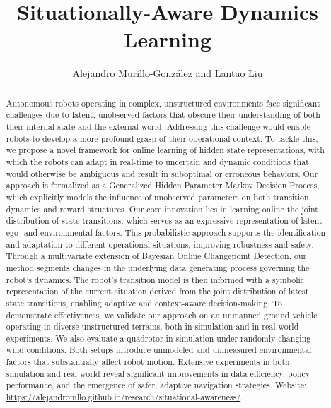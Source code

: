 \documentclass[Afour,sageh,times]{sagej}
\theoremstyle{lemma}
\begin{document}


\title{Situationally-Aware Dynamics Learning}

\author{}
\author{Alejandro Murillo-González {\normalsize and}
    Lantao Liu%
}%
%

\begin{abstract}
Autonomous robots operating in complex, unstructured environments face significant challenges due to latent, unobserved factors that obscure their understanding of both their internal state and the external world. Addressing this challenge would enable robots to develop a more profound grasp of their operational context. To tackle this, we propose a novel framework for online learning of hidden state representations, with which the robots can adapt in real-time to uncertain and dynamic conditions that would otherwise be ambiguous and result in suboptimal or erroneous behaviors. Our approach is formalized as a Generalized Hidden Parameter Markov Decision Process, which explicitly models the influence of unobserved parameters on both transition dynamics and reward structures. Our core innovation lies in learning online the joint distribution of state transitions, which serves as an expressive representation of latent ego- and environmental-factors.  This probabilistic approach supports the identification and adaptation to different operational situations, improving robustness and safety.  Through a multivariate extension of Bayesian Online Changepoint Detection, our method segments changes in the underlying data generating process governing the robot's dynamics. The robot's transition model is then informed with a symbolic representation of the current situation derived from the joint distribution of latest state transitions, enabling adaptive and context-aware decision-making. 
To demonstrate effectiveness, we validate our approach on an unmanned ground vehicle operating in diverse unstructured terrains, both in simulation and in real-world experiments. We also evaluate a quadrotor in simulation under randomly changing wind conditions. Both setups introduce unmodeled and unmeasured environmental factors that substantially affect robot motion.
Extensive experiments in both simulation and real world reveal significant improvements in data efficiency, policy performance, and the emergence of safer, adaptive navigation strategies. 
Website: \url{https://alejandromllo.github.io/research/situational-awareness/}.
\end{abstract}
\end{document}
